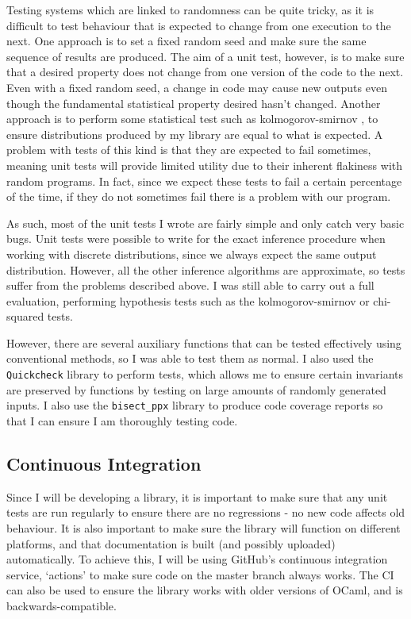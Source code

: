 Testing systems which are linked to randomness can be quite tricky, as it is difficult to test behaviour that is expected to change from one execution to the next. One approach is to set a fixed random seed and make sure the same sequence of results are produced. The aim of a unit test, however, is to make sure that a desired property does not change from one version of the code to the next. Even with a fixed random seed, a change in code may cause new outputs even though the fundamental statistical property desired hasn't changed. Another approach is to perform some statistical test such as kolmogorov-smirnov \cite{massey1951kolmogorov}, to ensure distributions produced by my library are equal to what is expected. A problem with tests of this kind is that they are expected to fail sometimes, meaning unit tests will provide limited utility due to their inherent flakiness with random programs. In fact, since we expect these tests to fail a certain percentage of the time, if they do not sometimes fail there is a problem with our program.

As such, most of the unit tests I wrote are fairly simple and only catch very basic bugs. Unit tests were possible to write for the exact inference procedure when working with discrete distributions, since we always expect the same output distribution. However, all the other inference algorithms are approximate, so tests suffer from the problems described above. I was still able to carry out a full evaluation, performing hypothesis tests such as the kolmogorov-smirnov or chi-squared tests.

However, there are several auxiliary functions that can be tested effectively using conventional methods, so I was able to test them as normal. I also used the \texttt{Quickcheck} library to perform tests, which allows me to ensure certain invariants are preserved by functions by testing on large amounts of randomly generated inputs. I also use the \texttt{bisect\_ppx} library to produce code coverage reports so that I can ensure I am thoroughly testing code.


\subsection{Continuous Integration}
Since I will be developing a library, it is important to make sure that any unit tests are run regularly to ensure there are no regressions - no new code affects old behaviour. It is also important to make sure the library will function on different platforms, and that documentation is built (and possibly uploaded) automatically. To achieve this, I will be using GitHub's continuous integration service, `actions' to make sure code on the master branch always works. The CI can also be used to ensure the library works with older versions of OCaml, and is backwards-compatible.

